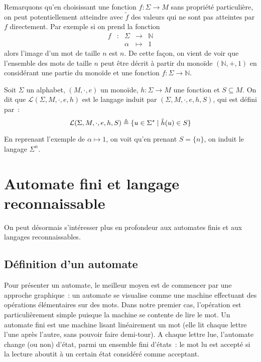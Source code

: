 Remarquons qu'en choisissant une fonction $f : \Sigma \to M$ sans propriété
particulière, on peut potentiellement atteindre avec $\tilde f$ des valeurs qui
ne sont pas atteintes par $f$ directement. Par exemple si on prend la fonction
\[\begin{array}{ccccc}
f & : & \Sigma & \longrightarrow & \mathbb N\\
& & \alpha & \longmapsto & 1
\end{array}\]
alors l'image d'un mot de taille $n$ est $n$. De cette façon, on vient de voir
que l'ensemble des mots de taille $n$ peut être décrit à partir du monoïde
$(\mathbb N,+,1)$ en considérant une partie du monoïde et une fonction
$f : \Sigma \to \mathbb N$.

\begin{definition}
  Soit $\Sigma$ un alphabet, $(M,\cdot,e)$ un monoïde, $h : \Sigma \to M$ une
  fonction et $S\subseteq M$. On dit que $\mathcal L(\Sigma,M,\cdot,e,h)$ est
  le langage induit par $(\Sigma,M,\cdot,e,h,S)$, qui est défini par~:
  \[\mathcal L(\Sigma,M,\cdot,e,h,S)\triangleq
  \{u\in\Sigma^\star\mid \tilde h(u)\in S\}\]
\end{definition}

En reprenant l'exemple de $\alpha \mapsto 1$, on voit qu'en prenant $S = \{n\}$,
on induit le langage $\Sigma^n$.

\section{Automate fini et langage reconnaissable}

On peut désormais s'intéresser plus en profondeur aux automates finis et aux
langages reconnaissables.

\subsection{Définition d'un automate}

Pour présenter un automate, le meilleur moyen est de commencer par une approche
graphique~: un automate se visualise comme une machine effectuant des opérations
élémentaires sur des mots. Dans notre premier cas, l'opération est
particulièrement simple puisque la machine se contente de lire le mot. Un
automate fini est une machine lisant linéairement un mot (elle lit chaque lettre
l'une après l'autre, sans pouvoir faire demi-tour). A chaque lettre lue,
l'automate change (ou non) d'état, parmi un ensemble fini d'états~: le mot lu
est accepté si la lecture aboutit à un certain état considéré comme acceptant.

